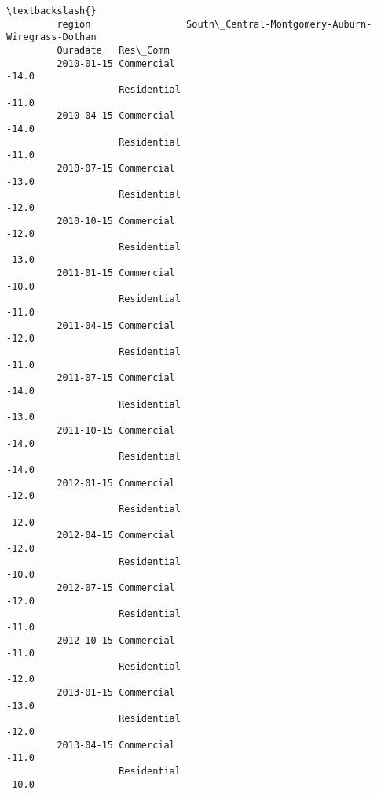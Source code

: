 \documentclass[11pt]{article}
\begin{document}
\begin{Verbatim}[commandchars=\\\{\}]
                                                                                  \textbackslash{}
         region                 South\_Central-Montgomery-Auburn-Wiregrass-Dothan   
         Quradate   Res\_Comm                                                       
         2010-01-15 Commercial                                             -14.0   
                    Residential                                            -11.0   
         2010-04-15 Commercial                                             -14.0   
                    Residential                                            -11.0   
         2010-07-15 Commercial                                             -13.0   
                    Residential                                            -12.0   
         2010-10-15 Commercial                                             -12.0   
                    Residential                                            -13.0   
         2011-01-15 Commercial                                             -10.0   
                    Residential                                            -11.0   
         2011-04-15 Commercial                                             -12.0   
                    Residential                                            -11.0   
         2011-07-15 Commercial                                             -14.0   
                    Residential                                            -13.0   
         2011-10-15 Commercial                                             -14.0   
                    Residential                                            -14.0   
         2012-01-15 Commercial                                             -12.0   
                    Residential                                            -12.0   
         2012-04-15 Commercial                                             -12.0   
                    Residential                                            -10.0   
         2012-07-15 Commercial                                             -12.0   
                    Residential                                            -11.0   
         2012-10-15 Commercial                                             -11.0   
                    Residential                                            -12.0   
         2013-01-15 Commercial                                             -13.0   
                    Residential                                            -12.0   
         2013-04-15 Commercial                                             -11.0   
                    Residential                                            -10.0   

\end{Verbatim}
\end{document}
